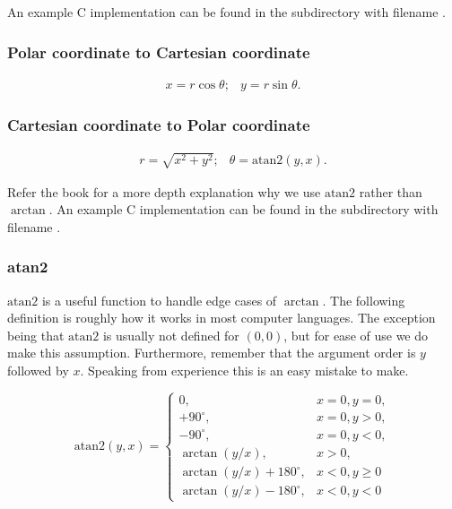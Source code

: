 An example C implementation can be found in the  subdirectory with filename .

\subsubsection{Polar coordinate to Cartesian coordinate}

$$
\begin{array}{lr}
x=r\cos\theta; & y=r\sin\theta.
\end{array}
$$

\subsubsection{Cartesian coordinate to Polar coordinate}

$$
\begin{array}{lr}
r=\sqrt{x^2+y^2}; & \theta=\text{atan2}(y,x).
\end{array}
$$

Refer the book for a more depth explanation why we use $\text{atan2}$ rather than $\arctan$. An example C implementation can be found in the  subdirectory with filename .

\subsubsection{atan2}

$\text{atan2}$ is a useful function to handle edge cases of $\arctan$. The following definition is roughly how it works in most computer languages. The exception being that $\text{atan2}$ is usually not defined for $(0,0)$, but for ease of use we do make this assumption. Furthermore, remember that the argument order is $y$ followed by $x$. Speaking from experience this is an easy mistake to make.

\begin{equation*}
	\text{atan2}(y,x) =
	\begin{cases}
		0, & x=0,y=0, \\
		+90^\circ, & x=0,y>0, \\
		-90^\circ, & x=0,y<0, \\
		\arctan(y/x), & x>0, \\
		\arctan(y/x)+180^\circ, & x<0,y\geq 0 \\
		\arctan(y/x)-180^\circ, & x<0,y<0
	\end{cases}
\end{equation*}

